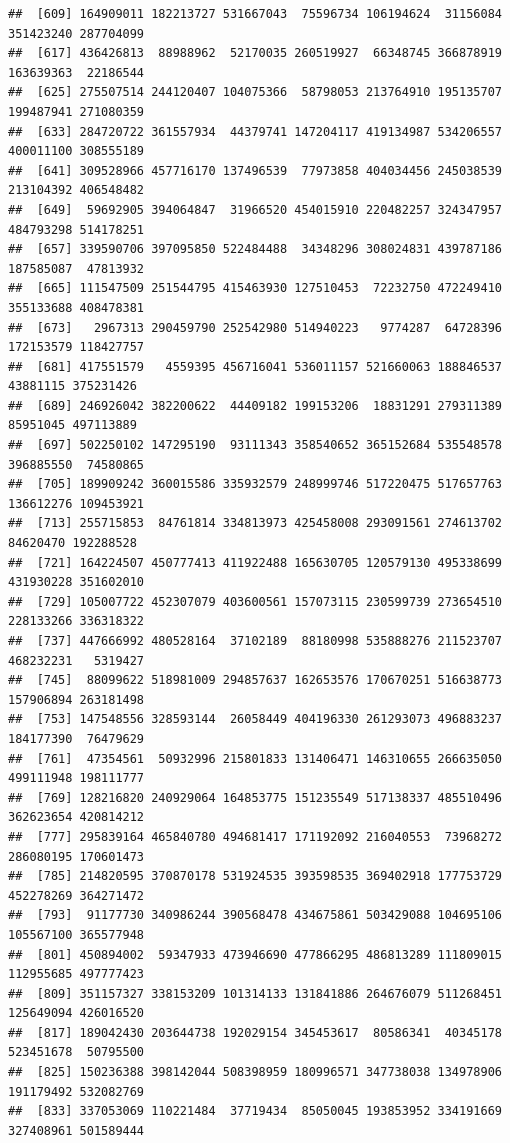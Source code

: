 \documentclass{article}\usepackage[]{graphicx}\usepackage[]{color}
\makeatletter
\newenvironment{kframe}{%
 \def\at@end@of@kframe{}%
 \ifinner\ifhmode%
  \def\at@end@of@kframe{\end{minipage}}%
  \begin{minipage}{\columnwidth}%
 \fi\fi%
 \def\FrameCommand##1{\hskip\@totalleftmargin \hskip-\fboxsep
 \colorbox{shadecolor}{##1}\hskip-\fboxsep
     \hskip-\linewidth \hskip-\@totalleftmargin \hskip\columnwidth}%
 \MakeFramed {\advance\hsize-\width
   \@totalleftmargin\z@ \linewidth\hsize
   \@setminipage}}%
 {\par\unskip\endMakeFramed%
 \at@end@of@kframe}
\newenvironment{knitrout}{}{} %
\makeatother
\begin{document}
\begin{knitrout}
\begin{kframe}
\begin{verbatim}
##  [609] 164909011 182213727 531667043  75596734 106194624  31156084 351423240 287704099
##  [617] 436426813  88988962  52170035 260519927  66348745 366878919 163639363  22186544
##  [625] 275507514 244120407 104075366  58798053 213764910 195135707 199487941 271080359
##  [633] 284720722 361557934  44379741 147204117 419134987 534206557 400011100 308555189
##  [641] 309528966 457716170 137496539  77973858 404034456 245038539 213104392 406548482
##  [649]  59692905 394064847  31966520 454015910 220482257 324347957 484793298 514178251
##  [657] 339590706 397095850 522484488  34348296 308024831 439787186 187585087  47813932
##  [665] 111547509 251544795 415463930 127510453  72232750 472249410 355133688 408478381
##  [673]   2967313 290459790 252542980 514940223   9774287  64728396 172153579 118427757
##  [681] 417551579   4559395 456716041 536011157 521660063 188846537  43881115 375231426
##  [689] 246926042 382200622  44409182 199153206  18831291 279311389  85951045 497113889
##  [697] 502250102 147295190  93111343 358540652 365152684 535548578 396885550  74580865
##  [705] 189909242 360015586 335932579 248999746 517220475 517657763 136612276 109453921
##  [713] 255715853  84761814 334813973 425458008 293091561 274613702  84620470 192288528
##  [721] 164224507 450777413 411922488 165630705 120579130 495338699 431930228 351602010
##  [729] 105007722 452307079 403600561 157073115 230599739 273654510 228133266 336318322
##  [737] 447666992 480528164  37102189  88180998 535888276 211523707 468232231   5319427
##  [745]  88099622 518981009 294857637 162653576 170670251 516638773 157906894 263181498
##  [753] 147548556 328593144  26058449 404196330 261293073 496883237 184177390  76479629
##  [761]  47354561  50932996 215801833 131406471 146310655 266635050 499111948 198111777
##  [769] 128216820 240929064 164853775 151235549 517138337 485510496 362623654 420814212
##  [777] 295839164 465840780 494681417 171192092 216040553  73968272 286080195 170601473
##  [785] 214820595 370870178 531924535 393598535 369402918 177753729 452278269 364271472
##  [793]  91177730 340986244 390568478 434675861 503429088 104695106 105567100 365577948
##  [801] 450894002  59347933 473946690 477866295 486813289 111809015 112955685 497777423
##  [809] 351157327 338153209 101314133 131841886 264676079 511268451 125649094 426016520
##  [817] 189042430 203644738 192029154 345453617  80586341  40345178 523451678  50795500
##  [825] 150236388 398142044 508398959 180996571 347738038 134978906 191179492 532082769
##  [833] 337053069 110221484  37719434  85050045 193853952 334191669 327408961 501589444

\end{verbatim}
\end{kframe}
\end{knitrout}
\end{document}
